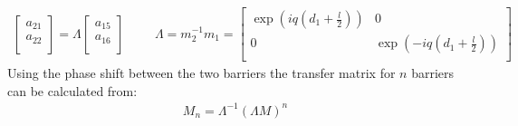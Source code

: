 \documentclass[12pt,a4paper]{report}
\begin{document}
				\begin{align}
					\left[\begin{array}{cc}
						a_{21}\\
						a_{22}\\
					\end{array}\right]
					=\Lambda
					\left[\begin{array}{cc}
						a_{15}\\
						a_{16}\\
					\end{array}\right]
					\hspace{1cm}	
					\Lambda=m_{2}^{-1}m_{1}=
					\left[\begin{array}{cc}
						\exp(iq\left(d_{1}+\frac{l}{2}\right))&0\\
						0&\exp(-iq\left(d_{1}+\frac{l}{2}\right))\\
					\end{array}\right]
				\end{align}
				Using the phase shift between the two barriers the transfer matrix for $n$ barriers can be calculated from:
				\begin{align}
					M_{n}=\Lambda^{-1}\left(\Lambda M\right)^{n}
					\label{mn}
				\end{align}
\end{document}
